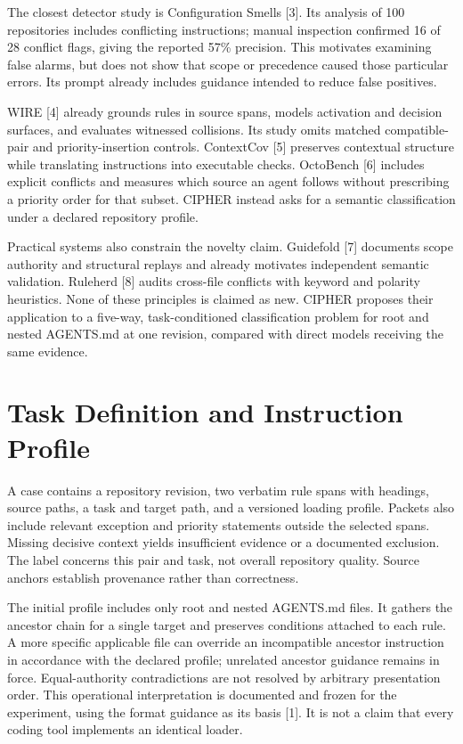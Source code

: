 \documentclass[10pt,conference]{IEEEtran}
\begin{document}
The closest detector study is Configuration Smells [3]. Its analysis of 100 repositories includes conflicting instructions; manual inspection confirmed 16 of 28 conflict flags, giving the reported 57\% precision. This motivates examining false alarms, but does not show that scope or precedence caused those particular errors. Its prompt already includes guidance intended to reduce false positives.


WIRE [4] already grounds rules in source spans, models activation and decision surfaces, and evaluates witnessed collisions. Its study omits matched compatible-pair and priority-insertion controls. ContextCov [5] preserves contextual structure while translating instructions into executable checks. OctoBench [6] includes explicit conflicts and measures which source an agent follows without prescribing a priority order for that subset. CIPHER instead asks for a semantic classification under a declared repository profile.


Practical systems also constrain the novelty claim. Guidefold [7] documents scope authority and structural replays and already motivates independent semantic validation. Ruleherd [8] audits cross-file conflicts with keyword and polarity heuristics. None of these principles is claimed as new. CIPHER proposes their application to a five-way, task-conditioned classification problem for root and nested AGENTS.md at one revision, compared with direct models receiving the same evidence.


\section{Task Definition and Instruction Profile}

A case contains a repository revision, two verbatim rule spans with headings, source paths, a task and target path, and a versioned loading profile. Packets also include relevant exception and priority statements outside the selected spans. Missing decisive context yields insufficient evidence or a documented exclusion. The label concerns this pair and task, not overall repository quality. Source anchors establish provenance rather than correctness.


The initial profile includes only root and nested AGENTS.md files. It gathers the ancestor chain for a single target and preserves conditions attached to each rule. A more specific applicable file can override an incompatible ancestor instruction in accordance with the declared profile; unrelated ancestor guidance remains in force. Equal-authority contradictions are not resolved by arbitrary presentation order. This operational interpretation is documented and frozen for the experiment, using the format guidance as its basis [1]. It is not a claim that every coding tool implements an identical loader.
\end{document}
